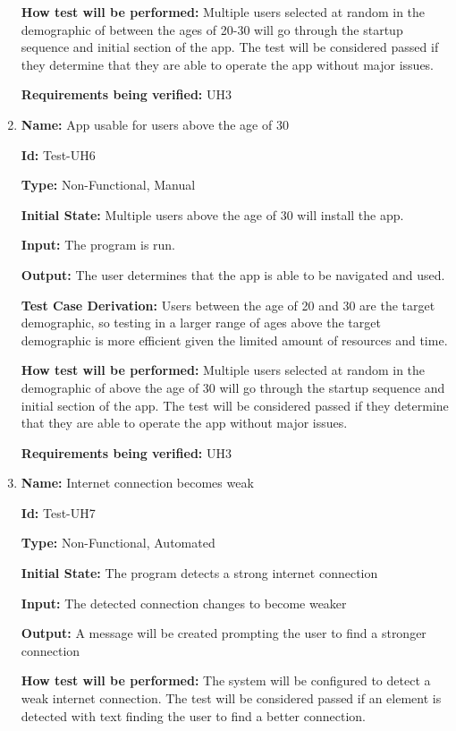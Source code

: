 \documentclass[12pt, titlepage]{article}
\begin{document}
\begin{enumerate}
\textbf{How test will be performed:} Multiple users selected at random in the demographic of between the ages of 20-30 will go through the startup sequence and initial section of the app. The test will be considered passed if they determine that they are able to operate the app without major issues. 

\textbf{Requirements being verified:} UH3

\item{\textbf{Name:} App usable for users above the age of 30}

\textbf{Id:} Test-UH6

\textbf{Type:} Non-Functional, Manual
					
\textbf{Initial State:} Multiple users above the age of 30 will install the app.
					
\textbf{Input:} The program is run.
					
\textbf{Output:} The user determines that the app is able to be navigated and used.

\textbf{Test Case Derivation:} Users between the age of 20 and 30 are the target demographic, so testing in a larger range of ages above the target demographic is more efficient given the limited amount of resources and time.
					
\textbf{How test will be performed:} Multiple users selected at random in the demographic of above the age of 30 will go through the startup sequence and initial section of the app. The test will be considered passed if they determine that they are able to operate the app without major issues. 

\textbf{Requirements being verified:} UH3

\item{\textbf{Name:} Internet connection becomes weak}

\textbf{Id:} Test-UH7

\textbf{Type:} Non-Functional, Automated
					
\textbf{Initial State:} The program detects a strong internet connection
					
\textbf{Input:} The detected connection changes to become weaker
					
\textbf{Output:} A message will be created prompting the user to find a stronger connection
					
\textbf{How test will be performed:} The system will be configured to detect a weak internet connection. The test will be considered passed if an element is detected with text finding the user to find a better connection.


\end{enumerate}
\end{document}

